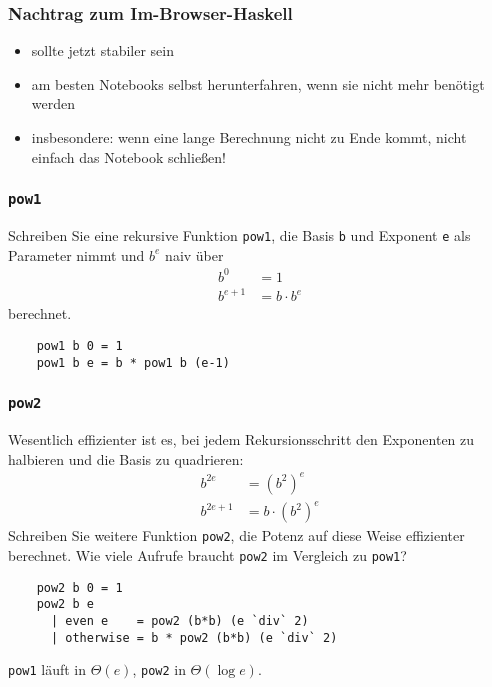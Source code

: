 \documentclass{beamer}
\date{2016-10-28/31}
\begin{document}
\normalsize
\normalem

\begin{frame}[plain]
  \titlepage
\end{frame}

\begin{frame}
  \frametitle{Nachtrag zum Im-Browser-Haskell}
  \begin{itemize}
  \item sollte jetzt stabiler sein
  \item am besten Notebooks selbst herunterfahren, wenn sie nicht mehr benötigt werden
  \item insbesondere: wenn eine lange Berechnung nicht zu Ende kommt, nicht einfach das Notebook schließen!
  \end{itemize}
\end{frame}

\begin{frame}[fragile]
  \frametitle{\lstinline{pow1}}
  Schreiben Sie eine rekursive Funktion \lstinline{pow1}, die Basis \lstinline{b} und Exponent \lstinline{e} als Parameter nimmt und $b^e$ naiv über
  \begin{align*}
    b^0 &= 1\\
    b^{e+1} &= b \cdot b^e
  \end{align*}
  berechnet.
  \pause
  \begin{lstlisting}
    pow1 b 0 = 1
    pow1 b e = b * pow1 b (e-1)
  \end{lstlisting}
\end{frame}

\begin{frame}[fragile]
  \frametitle{\lstinline{pow2}}
  Wesentlich effizienter ist es, bei jedem Rekursionsschritt den Exponenten zu halbieren und die Basis zu quadrieren:
  \begin{align*}
    b^{2e} &= (b^2)^e \\
    b^{2e+1} &= b \cdot (b^2)^e
  \end{align*}
  Schreiben Sie weitere Funktion \lstinline{pow2}, die Potenz auf diese Weise effizienter berechnet.
  Wie viele Aufrufe braucht \lstinline{pow2} im Vergleich zu \lstinline{pow1}?
  \pause
  \begin{lstlisting}
    pow2 b 0 = 1
    pow2 b e
      | even e    = pow2 (b*b) (e `div` 2)
      | otherwise = b * pow2 (b*b) (e `div` 2)
  \end{lstlisting}
  
  \pause
  \lstinline{pow1} läuft in $\Theta(e)$, \lstinline{pow2} in $\Theta(\log e)$.
\end{frame}
\end{document}
